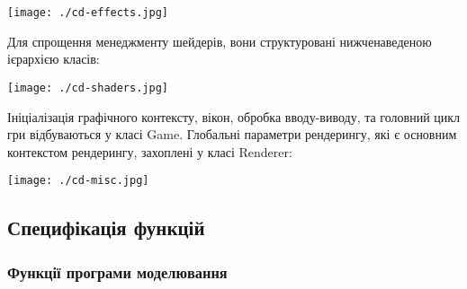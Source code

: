 \begin{center}
  \texttt{[image: ./cd-effects.jpg]}
\end{center}

Для спрощення менеджменту шейдерів, вони структуровані нижченаведеною ієрархією класів:

\begin{center}
  \texttt{[image: ./cd-shaders.jpg]}
\end{center}

Ініціалізація графічного контексту, вікон, обробка вводу-виводу, та головний цикл гри відбуваються у класі Game. Глобальні параметри рендерингу, які є основним контекстом рендерингу, захоплені у класі Renderer:

\begin{center}
  \texttt{[image: ./cd-misc.jpg]}
\end{center}

\subsection{Специфікація функцій}

\subsubsection{Функції програми моделювання}

